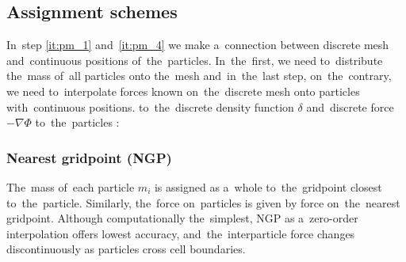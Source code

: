 \subsection{Assignment schemes}
In~step \ref{it:pm_1} and~\ref{it:pm_4} we make a~connection between discrete mesh and~continuous positions of~the~particles. In~the~first, we need to~distribute the~mass of~all particles onto the~mesh and~in~the~last step, on~the~contrary, we need to~interpolate forces known on~the~discrete mesh onto particles with~continuous positions. \DIFdelbegin {}\DIFdelend \DIFaddbegin {}\DIFaddend to~the~discrete density function $\delta$ and~\DIFaddbegin {}\DIFaddend discrete force $-\nabla\Phi$ to~the~particles \DIFaddbegin {}\DIFaddend :

\subsubsection{Nearest gridpoint (NGP)}
The~mass of~each particle $m_i$ is assigned as a~whole to~the~gridpoint closest to~the~particle. Similarly, the~force on~particles is given by force on~the~nearest gridpoint. Although computationally the~simplest, NGP as a~zero-order interpolation offers lowest accuracy, and~the~interparticle force changes discontinuously as particles cross cell boundaries.

